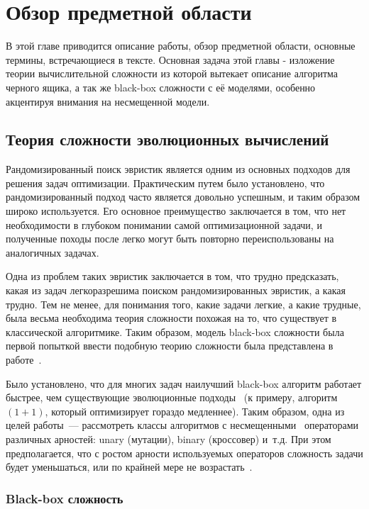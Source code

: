 \chapter{Обзор предметной области}
\label{chapter1}

В этой главе приводится описание работы, обзор предметной области, основные термины, встречающиеся в тексте. Основная задача этой главы - изложение теории вычислительной сложности из которой вытекает описание алгоритма черного ящика, а так же black-box сложности с её моделями, особенно акцентируя внимания на несмещенной модели.

\section{Теория сложности эволюционных вычислений}
Рандомизированный поиск эвристик является одним из основных подходов для решения задач оптимизации. Практическим путем было установлено, что рандомизированный подход
часто является довольно успешным, и таким образом широко используется. Его основное преимущество заключается в том, что нет необходимости в глубоком понимании самой
оптимизационной задачи, и полученные походы после легко могут быть повторно переиспользованы на аналогичных задачах.

Одна из проблем таких эвристик заключается в том, что трудно предсказать, какая из задач легкоразрешима поиском рандомизированных эвристик, а какая трудно. Тем не менее, для понимания того, 
какие задачи легкие, а какие трудные, была весьма необходима теория сложности похожая на то, что существует в классической алгоритмике. Таким образом, модель black-box сложности была первой 
попыткой ввести подобную теорию сложности была представлена в работе~\cite{2}. 

Было установлено, что для многих задач наилучший black-box алгоритм работает быстрее, чем существующие эволюционные подходы~\cite{10} (к примеру, алгоритм $(1+1)$, который оптимизирует гораздо медленнее). 
Таким образом, одна из целей работы~--- рассмотреть классы алгоритмов с несмещенными~\cite{1} операторами различных арностей: unary (мутации), binary (кроссовер) и~т.д.
При этом предполагается, что с ростом арности используемых операторов сложность задачи будет уменьшаться, или по крайней мере не возрастать~\cite{8,11,12}. 

\subsection{Black-box сложность}

